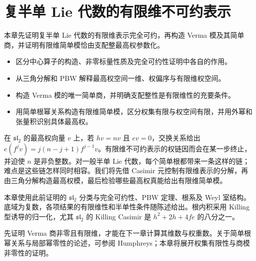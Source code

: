 

\chapter{复半单 Lie 代数的有限维不可约表示}
\label{b5:ch:18}

\begin{chapterabstract}
	本章先证明复半单 Lie 代数的有限维表示完全可约，再构造 Verma 模及其简单商，并证明有限维简单模恰由支配整最高权参数化。
\end{chapterabstract}

\begin{learninggoals}
	\begin{itemize}
		\item 区分中心算子的构造、非零标量性质及完全可约性证明中各自的作用。
		\item 从三角分解和 PBW 解释最高权空间一维、权偏序与有限维权空间。
		\item 构造 Verma 模的唯一简单商，并明确支配整性是有限维性的充要条件。
		\item 用简单根幂关系构造有限维简单模，区分权集有限与权空间有限，并用外幂和张量积识别具体最高权。
	\end{itemize}
\end{learninggoals}

在 \(\mathfrak{sl}_2\) 的最高权向量 \(v\) 上，若 \(hv=nv\) 且 \(ev=0\)，交换关系给出 \(e(f^jv)=j(n-j+1)f^{j-1}v\)。有限维不可约表示的权链因而会在某一步终止，并迫使 \(n\) 是非负整数。对一般半单 Lie 代数，每个简单根都带来一条这样的链；难点是这些链怎样同时相容。我们将先借 Casimir 元控制有限维表示的分解，再由三角分解构造最高权模，最后检验哪些最高权真能给出有限维简单模。

\ProseParagraphBreak
本章使用此前证明的 \(\mathfrak{sl}_2\) 分类与完全可约性、PBW 定理、根系及 Weyl 室结构。底域为复数，各项结果的有限维性和半单性条件随陈述给出。根内积采用 Killing 型诱导的归一化，尤其 \(\mathfrak{sl}_2\) 的 Killing Casimir 是 \(h^2+2h+4fe\) 的八分之一。

\ProseParagraphBreak
先证明 Verma 商非零且有限维，才能在下一章计算其维数与权重数。关于简单根幂关系与局部幂零性的论述，可参阅 Humphreys\cite[Section 21.4, pp. 115--116]{Humphreys1972LieAlgebras}；本章将展开权集有限性与商模非零性的证明。






